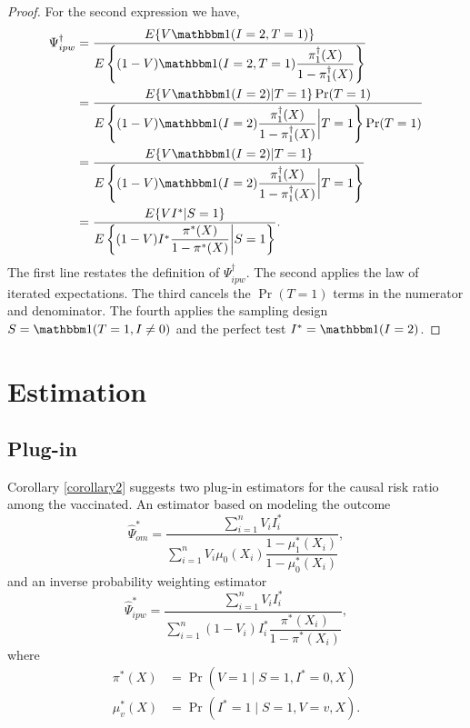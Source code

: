 \begin{appendix}
\begin{proof}
    For the second expression we have,
    \begin{align*}
        \Psi^\dagger_{ipw} &= \dfrac{E\{V \mathbbm 1 (I = 2, T = 1)\}}{E\left\{ (1 - V) \mathbbm 1(I = 2, T = 1) \dfrac{\pi^\dagger_1(X)}{1 - \pi^\dagger_1(X)}\right\}} \\
        &= \dfrac{E\{V \mathbbm 1 (I = 2) | T = 1\} \Pr(T = 1)}{E\left\{ (1 - V) \mathbbm 1(I = 2) \dfrac{\pi^\dagger_1(X)}{1 - \pi^\dagger_1(X)} \bigg| T = 1\right\} \Pr(T = 1)} \\
        &= \dfrac{E\{V \mathbbm 1 (I = 2) | T = 1\}}{E\left\{ (1 - V) \mathbbm 1(I = 2) \dfrac{\pi^\dagger_1(X)}{1 - \pi^\dagger_1(X)} \bigg| T = 1\right\}} \\
        &= \dfrac{E\{VI^*|S =1\}}{E\left\{ (1 - V) I^* \dfrac{\pi^*(X)}{1 - \pi^*(X)} \bigg| S = 1\right\}}.
    \end{align*}
    The first line restates the definition of $\Psi^\dagger_{ipw}$. The second applies the law of iterated expectations. The third cancels the $\Pr(T = 1)$ terms in the numerator and denominator. The fourth applies the sampling design $S = \mathbbm 1 (T = 1, I \neq 0)$ and the perfect test $I^* = \mathbbm 1(I = 2)$.
    
    \end{proof}
    \newpage
    \section{Estimation}
    \subsection{Plug-in}
    Corollary \ref{corollary2} suggests two plug-in estimators for the causal risk ratio among the vaccinated.  An estimator based on modeling the outcome
    \begin{equation}
        \widehat{\Psi}_{om}^* = \dfrac{\sum_{i=1}^n V_i I^*_i}{\sum_{i=1}^n V_i \mu_0(X_i)\dfrac{1 - \mu^*_1(X_i)}{1 - \mu^*_0(X_i)}},
    \end{equation}
    and an inverse probability weighting estimator
    \begin{equation}
        \widehat{\Psi}_{ipw}^* = \dfrac{\sum_{i=1}^n V_i I^*_i}{\sum_{i=1}^n (1 - V_i) I^*_i \dfrac{\pi^*(X_i)}{1 - \pi^*(X_i)}},
    \end{equation}
    where 
    \begin{align*}
        \pi^*(X) &= \Pr(V=1\mid S=1, I^*=0, X) \\
        \mu^*_v(X) &= \Pr(I^*=1\mid S=1, V=v, X).
    \end{align*}


\end{appendix}
